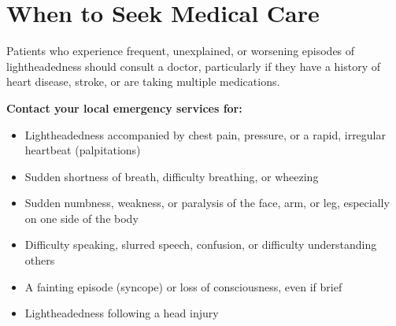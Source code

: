 \section*{When to Seek Medical Care}
Patients who experience frequent, unexplained, or worsening episodes of lightheadedness should consult a doctor, particularly if they have a history of heart disease, stroke, or are taking multiple medications.

\textbf{Contact your local emergency services for:}
\begin{itemize}
    \item Lightheadedness accompanied by chest pain, pressure, or a rapid, irregular heartbeat (palpitations)
    \item Sudden shortness of breath, difficulty breathing, or wheezing
    \item Sudden numbness, weakness, or paralysis of the face, arm, or leg, especially on one side of the body
    \item Difficulty speaking, slurred speech, confusion, or difficulty understanding others
    \item A fainting episode (syncope) or loss of consciousness, even if brief
    \item Lightheadedness following a head injury
\end{itemize}

